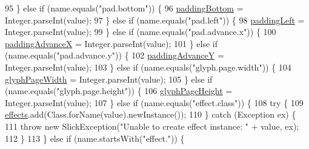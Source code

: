 \begin{DoxyCode}
95                 \} \textcolor{keywordflow}{else} \textcolor{keywordflow}{if} (name.equals(\textcolor{stringliteral}{"pad.bottom"})) \{
96                     \mbox{\hyperlink{classorg_1_1newdawn_1_1slick_1_1font_1_1_hiero_settings_a4ae9e95c341789431f72c0d7ad54b348}{paddingBottom}} = Integer.parseInt(value);
97                 \} \textcolor{keywordflow}{else} \textcolor{keywordflow}{if} (name.equals(\textcolor{stringliteral}{"pad.left"})) \{
98                     \mbox{\hyperlink{classorg_1_1newdawn_1_1slick_1_1font_1_1_hiero_settings_ae145770ffd7fbe5fb0bc1e54be252734}{paddingLeft}} = Integer.parseInt(value);
99                 \} \textcolor{keywordflow}{else} \textcolor{keywordflow}{if} (name.equals(\textcolor{stringliteral}{"pad.advance.x"})) \{
100                     \mbox{\hyperlink{classorg_1_1newdawn_1_1slick_1_1font_1_1_hiero_settings_a95bbfc376e37c8cbddb33d7e2fed2dd4}{paddingAdvanceX}} = Integer.parseInt(value);
101                 \} \textcolor{keywordflow}{else} \textcolor{keywordflow}{if} (name.equals(\textcolor{stringliteral}{"pad.advance.y"})) \{
102                     \mbox{\hyperlink{classorg_1_1newdawn_1_1slick_1_1font_1_1_hiero_settings_a9ebcbca5bb87465cbb18bbc40b1bb09e}{paddingAdvanceY}} = Integer.parseInt(value);
103                 \} \textcolor{keywordflow}{else} \textcolor{keywordflow}{if} (name.equals(\textcolor{stringliteral}{"glyph.page.width"})) \{
104                     \mbox{\hyperlink{classorg_1_1newdawn_1_1slick_1_1font_1_1_hiero_settings_aeed4e1a4668cfa3c3dc94d481f68a5c3}{glyphPageWidth}} = Integer.parseInt(value);
105                 \} \textcolor{keywordflow}{else} \textcolor{keywordflow}{if} (name.equals(\textcolor{stringliteral}{"glyph.page.height"})) \{
106                     \mbox{\hyperlink{classorg_1_1newdawn_1_1slick_1_1font_1_1_hiero_settings_a17c4e911610ef26561713830e4998cc1}{glyphPageHeight}} = Integer.parseInt(value);
107                 \} \textcolor{keywordflow}{else} \textcolor{keywordflow}{if} (name.equals(\textcolor{stringliteral}{"effect.class"})) \{
108                     \textcolor{keywordflow}{try} \{
109                         \mbox{\hyperlink{classorg_1_1newdawn_1_1slick_1_1font_1_1_hiero_settings_ad1134cfcc8c0f5d582f8abe54d7eeb80}{effects}}.add(Class.forName(value).newInstance());
110                     \} \textcolor{keywordflow}{catch} (Exception ex) \{
111                         \textcolor{keywordflow}{throw} \textcolor{keyword}{new} SlickException(\textcolor{stringliteral}{"Unable to create effect instance: "} + value, ex);
112                     \}
113                 \} \textcolor{keywordflow}{else} \textcolor{keywordflow}{if} (name.startsWith(\textcolor{stringliteral}{"effect."})) \{

\end{DoxyCode}

